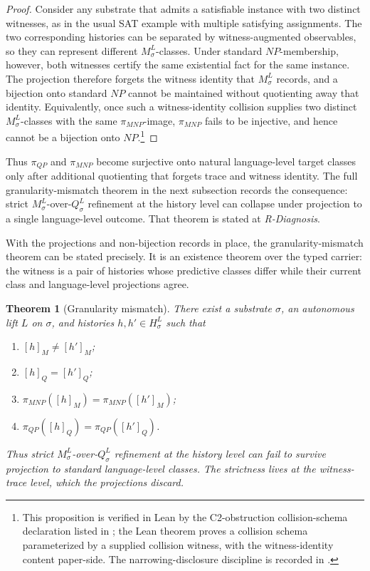 \documentclass[11pt]{article}
\newcommand{\Substrate}{\sigma}             \newcommand{\Lift}{L}                       \newcommand{\LiftState}{\sigma_{L}}         \newcommand{\HistorySpace}{H_{\Substrate}^{\Lift}}
\newcommand{\Qquotient}{Q_{\Substrate}^{\Lift}}
\newcommand{\Mquotient}{M_{\Substrate}^{\Lift}}
\newcommand{\Qclass}[1]{[#1]_{Q}}
\newcommand{\Mclass}[1]{[#1]_{M}}
\newcommand{\PiQP}{\pi_{QP}}                \newcommand{\PiMNP}{\pi_{MNP}}
\newcommand{\RDiagnosis}{\emph{R-Diagnosis}}
\newtheorem{theorem}{Theorem}[section]
\theoremstyle{definition}
\begin{document}
\begin{proof}
Consider any substrate that admits a satisfiable instance with two
distinct witnesses, as in the usual SAT example with multiple
satisfying assignments.  The two corresponding histories can be
separated by witness-augmented observables, so they can represent
different \(\Mquotient\)-classes.  Under standard \(NP\)-membership,
however, both witnesses certify the same existential fact for the same
instance.  The projection therefore forgets the witness identity that
\(\Mquotient\) records, and a bijection onto standard \(NP\) cannot be
maintained without quotienting away that identity.  Equivalently, once
such a witness-identity collision supplies two distinct
\(\Mquotient\)-classes with the same \(\PiMNP\)-image, \(\PiMNP\) fails
to be injective, and hence cannot be a bijection onto \(NP\).\footnote{This
proposition is verified in Lean by the C2-obstruction collision-schema
declaration listed in ; the Lean theorem proves
a collision schema parameterized by a supplied collision witness, with
the witness-identity content paper-side.  The narrowing-disclosure
discipline is recorded in .}
\end{proof}

Thus \(\PiQP\) and \(\PiMNP\) become surjective onto natural
language-level target classes only after additional quotienting that
forgets trace and witness identity.  The full granularity-mismatch
theorem in the next subsection records the consequence: strict
\(\Mquotient\)-over-\(\Qquotient\) refinement at the history level can
collapse under projection to a single language-level outcome.  That
theorem is stated at \RDiagnosis{}.

With the projections and non-bijection records in place, the
granularity-mismatch theorem can be stated precisely.  It is an
existence theorem over the typed carrier: the witness is a pair of
histories whose predictive classes differ while their current class and
language-level projections agree.

\begin{theorem}[Granularity mismatch]
\label{thm:granularity-mismatch}
There exist a substrate \(\Substrate\), an autonomous lift \(\Lift\) on
\(\Substrate\), and histories \(h,h'\in\HistorySpace\) such that
\begin{enumerate}
  \item \(\Mclass{h}\neq\Mclass{h'}\);
  \item \(\Qclass{h}=\Qclass{h'}\);
  \item \(\PiMNP(\Mclass{h})=\PiMNP(\Mclass{h'})\);
  \item \(\PiQP(\Qclass{h})=\PiQP(\Qclass{h'})\).
\end{enumerate}
Thus strict \(\Mquotient\)-over-\(\Qquotient\) refinement at the
history level can fail to survive projection to standard
language-level classes.  The strictness lives at the witness-trace
level, which the projections discard.
\end{theorem}
\end{document}
